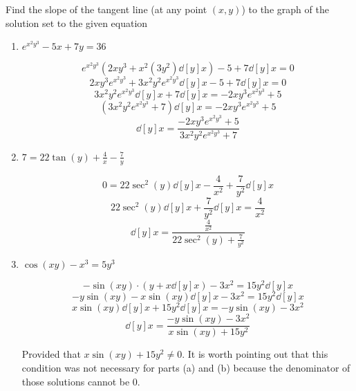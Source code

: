 \documentclass[nooutcomes]{ximera}
\begin{document}
\begin{problem}
Find the slope of the tangent line (at any point $(x,y)$) to the graph of the solution set to the given equation

	\begin{enumerate}
	
	\item  $e^{x^2 y^3} - 5x + 7y = 36$
			\begin{freeResponse}
			$$ e^{x^2 y^3} \left( 2xy^3 + x^2 (3y^2)\dd[y]{x} \right) - 5 + 7\dd[y]{x} = 0 $$
			$$ 2xy^3 e^{x^2y^3} + 3x^2y^2e^{x^2y^3}\dd[y]{x} - 5 + 7\dd[y]{x} = 0 $$
			$$ 3x^2y^2e^{x^2y^3}\dd[y]{x} + 7\dd[y]{x} = -2xy^3 e^{x^2y^3} + 5 $$
			$$ \left( 3x^2y^2e^{x^2y^3} + 7 \right) \dd[y]{x} = -2xy^3 e^{x^2y^3} + 5 $$
			$$  \dd[y]{x} = \frac{-2xy^3 e^{x^2y^3} + 5}{3x^2 y^2 e^{x^2y^3} + 7} $$
			\end{freeResponse}
			
			
			
	\item  $7 = 22 \tan(y) + \frac{4}{x} - \frac{7}{y}$
			\begin{freeResponse}
			$$ 0 = 22 \sec^2 (y) \dd[y]{x} - \frac{4}{x^2} + \frac{7}{y^2} \dd[y]{x} $$
			$$ 22 \sec^2(y) \dd[y]{x} + \frac{7}{y^2} \dd[y]{x} = \frac{4}{x^2} $$
			$$ \dd[y]{x} = \frac{\frac{4}{x^2}}{22 \sec^2(y) + \frac{7}{y^2}} $$
			\end{freeResponse}
			
			
			
	\item  $\cos(xy) - x^3 = 5y^3$
			\begin{freeResponse}
			$$ -\sin(xy) \cdot \left(y + x \dd[y]{x} \right) - 3x^2 = 15y^2 \dd[y]{x} $$
			$$ -y \sin(xy) - x \sin(xy) \dd[y]{x} - 3x^2 = 15y^2 \dd[y]{x} $$
			$$ x \sin(xy) \dd[y]{x} + 15y^2 \dd[y]{x} = -y \sin(xy) - 3x^2 $$
			$$ \dd[y]{x} = \frac{-y \sin(xy) - 3x^2}{x \sin(xy) + 15y^2} $$
			
			Provided that $x \sin(xy) + 15y^2 \neq 0$.  It is worth pointing out that this condition was not necessary for parts (a) and (b) because the denominator of those solutions cannot be $0$.  
			\end{freeResponse}
			
			
			
	\end{enumerate}
			
			
			
		
\end{problem}
	
\end{document}
